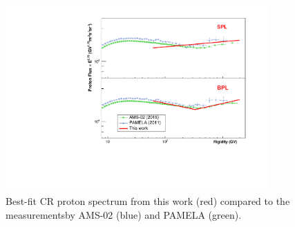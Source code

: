 \begin{figure}[h!]
    \centering
    \includegraphics[width=0.9\textwidth]{content/result_and_discussion/figures/ProtonSpectrumModelMeasurement.pdf}
    \caption{
        Best-fit CR proton spectrum from this work (red)
        compared to the measurementsby AMS-02 (blue) and
        PAMELA (green).
    }
    \label{fig:fitted_cr_proton}
\end{figure}

